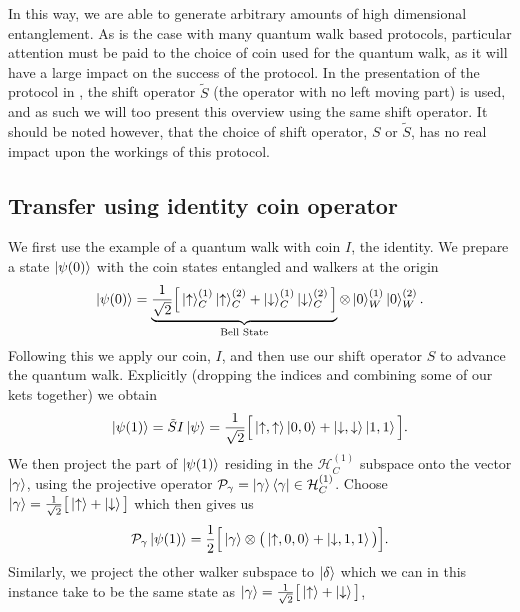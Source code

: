 In this way, we are able to generate arbitrary amounts of high dimensional entanglement. 
As is the case with many quantum walk based protocols, particular attention must be paid to the choice of coin used for the quantum walk, as it will have a large impact on the success of the protocol.
In the presentation of the protocol in \cite{giordani2020}, the shift operator $\tilde{S}$ (the operator with no left moving part) is used, and as such we will too present this overview using the same shift operator. It should be noted however, that the choice of shift operator, $S$ or $\tilde{S}$, has no real impact upon the workings of this protocol.

\subsection{Transfer using identity coin operator}
We first use the example of a quantum walk with coin $I$, the identity. We prepare a state $\ket{\psi(0)}$ with the coin states entangled and walkers at the origin
\begin{equation}
    \ket{\psi(0)} = \underbrace{\frac{1}{\sqrt{2}}\Big [\ket{\uparrow}^{(1)}_C\ket{\uparrow}^{(2)}_C + \ket{\downarrow}^{(1)}_C\ket{\downarrow}^{(2)}_C \Big]}_{\text{Bell State}}\otimes \ket{0}^{(1)}_W\ket{0}^{(2)}_W.
\end{equation}
Following this we apply our coin, $I$, and then use our shift operator $S$ to advance the quantum walk. Explicitly (dropping the indices and combining some of our kets together) we obtain
\begin{equation}
    \ket{\psi(1)} = \tilde{S}I\ket{\psi} = \frac{1}{\sqrt{2}}\Big [\ket{\uparrow,\uparrow}\ket{0,0} + \ket{\downarrow,\downarrow}\ket{1,1}\Big].
\end{equation}
We then project the part of $\ket{\psi(1)}$ residing in the $\mathcal{H}^{(1)}_C$ subspace onto the vector $\ket{\gamma}$, using the projective operator $\mathcal{P}_\gamma = \ket{\gamma}\bra{\gamma} \in \mathcal{H}^{(1)}_C$. Choose $\ket{\gamma} = \frac{1}{\sqrt{2}} \big [\ket{\uparrow} + \ket{\downarrow} \big]$ which then gives us
\begin{equation}
    \mathcal{P}_\gamma \ket{\psi(1)} = \frac{1}{2}\Big [\ket{\gamma}\otimes \big (\ket{\uparrow, 0, 0} + \ket{\downarrow, 1, 1}\big )\Big ].
\end{equation}
Similarly, we project the other walker subspace to $\ket{\delta}$ which we can in this instance take to be the same state as $\ket{\gamma} = \frac{1}{\sqrt{2}} \big [\ket{\uparrow} + \ket{\downarrow} \big]$,

